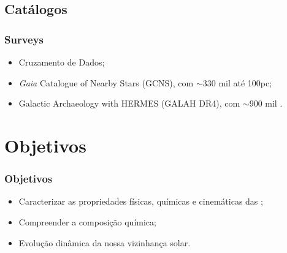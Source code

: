 \documentclass[10pt, aspectratio=169]{slidesiffmodelo}
\begin{document}
\subsection{Catálogos}
\begin{frame}[t, allowframebreaks]
    \frametitle{Surveys}
    \begin{textoimagem}
        \begin{itemize}
            \item Cruzamento de Dados;
            \item \emph{Gaia} Catalogue of Nearby Stars (GCNS), com $\sim 330$ mil \estrela até 100pc;
            \item Galactic Archaeology with HERMES (GALAH DR4), com $\sim 900$ mil \estrela.
        \end{itemize}
        
    \colunaimagem
    \end{textoimagem}
\end{frame}

\section{Objetivos}
\begin{frame}[t]
    \frametitle{Objetivos}
    \begin{itemize}
        \item Caracterizar as propriedades físicas, químicas e cinemáticas das \estrela;
        \item Compreender a composição química;
        \item Evolução dinâmica da nossa vizinhança solar.
    \end{itemize}
\end{frame}

\end{document}
